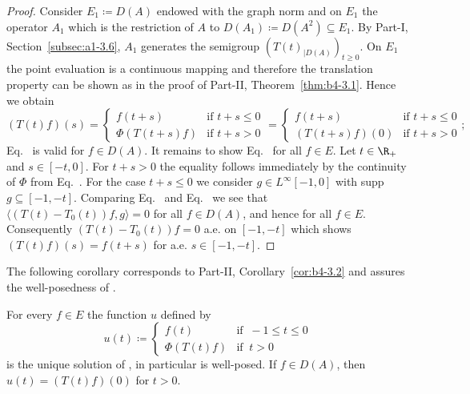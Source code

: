 \begin{proof}
Consider $E_1 \coloneq D(A)$ endowed with the graph norm 
and on $E_1$ the operator $A_1$ which is the restriction of\/ $A$ to $D(A_1) \coloneq D(A^{2})\subseteq E_1$.
By 
Part-I, Section~\ref{subsec:a1-3.6}, $A_1$ generates the semigroup $(T(t)_{|D(A)})_{t \geq 0}$.
On $E_1$ the point evaluation is a continuous mapping and therefore the translation property can be shown as in the proof of Part-II, Theorem~\ref{thm:b4-3.1}.
Hence we obtain
\begin{equation}\label{eq:c4-3.4}
(T(t)f)(s)= \begin{cases}
    f(t+s) &\text{if } t+s \leq 0 \\
    \Phi(T(t+s)f) &\text{if } t+s > 0
\end{cases} = \begin{cases}
    f(t+s) &\text{if } t+s \leq 0 \\
    (T(t+s)f)(0) &\text{if } t+s > 0
\end{cases};
\end{equation}
\ie Eq.~ is valid for $f \in D(A)$.
It remains to show Eq.~ for all $f \in E$.
Let $t \in \R_+$ and $s \in [-t,0]$.
For $t + s > 0$ the equality follows immediately by the continuity of\/ $\Phi$ from Eq.~.
For the case $t + s \leq 0$ we consider $g \in L^{\infty}[-1,0]$ with supp $g \subseteq [-1,-t]$.
Comparing Eq.~ and Eq.~ we see that $\langle(T(t)-T_0(t))f,g\rangle = 0$ for all $f \in D(A)$, and hence for all $f \in E$.
Consequently $(T(t)-T_{0}(t))f = 0$ a.e. on $[-1,-t]$ which shows $(T(t)f)(s) = f(t+s)$ for a.e. $s \in [-1,-t]$.
\end{proof}
The following corollary corresponds to Part-II, Corollary~\ref{cor:b4-3.2} and assures the well-posed\-ness of .
\begin{corollary}\label{cor:c4-3.2}
%
For every $f \in E$ the function $u$ defined by
\begin{equation}\label{eq:c4-3.5}
u(t) \coloneq  \begin{cases}
    f(t) & \text{if } \ -1 \leq t \leq 0 \\
    \Phi(T(t)f) & \text{if } \ t > 0
\end{cases}
\end{equation}
is the unique solution of , in particular  is well-posed.
If\/ $f \in D(A)$, then $u(t) = (T(t)f)(0)$ for $t > 0$.
\end{corollary}
